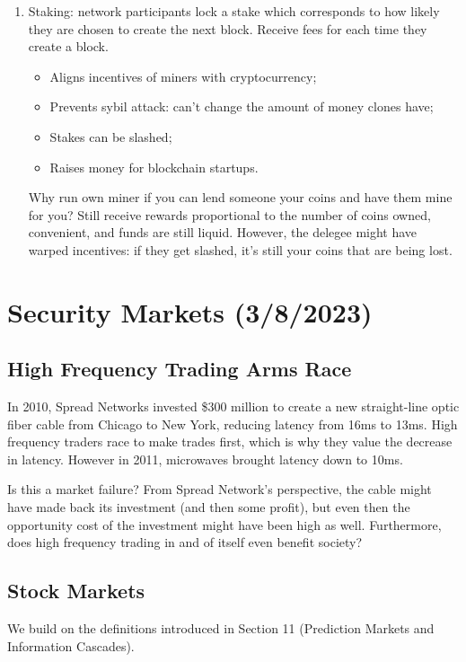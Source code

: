 \documentclass[dvipsnames]{article}
\theoremstyle{definition}
\theoremstyle{remark}
\begin{document}
\begin{enumerate}
	\item Staking: network participants lock a stake which corresponds to how likely they are chosen to create the next block. Receive fees for each time they create a block.
	\begin{itemize}
		\item Aligns incentives of miners with cryptocurrency;
		\item Prevents sybil attack: can't change the amount of money clones have;
		\item Stakes can be slashed;
		\item Raises money for blockchain startups.
	\end{itemize}
	Why run own miner if you can lend someone your coins and have them mine for you? Still receive rewards proportional to the number of coins owned, convenient, and funds are still liquid. However, the delegee might have warped incentives: if they get slashed, it's still your coins that are being lost.  
\end{enumerate}

\section{Security Markets (3/8/2023)}

\subsection{High Frequency Trading Arms Race}
In 2010, Spread Networks invested \$300 million to create a new straight-line optic fiber cable from Chicago to New York, reducing latency from 16ms to 13ms. High frequency traders race to make trades first, which is why they value the decrease in latency. However in 2011, microwaves brought latency down to 10ms. 

Is this a market failure? From Spread Network's perspective, the cable might have made back its investment (and then some profit), but even then the opportunity cost of the investment might have been high as well. Furthermore, does high frequency trading in and of itself even benefit society?

\subsection{Stock Markets}

We build on the definitions introduced in Section 11 (Prediction Markets and Information Cascades). 
\end{document}

